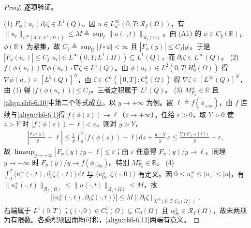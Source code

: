 \documentclass[../../main.tex]{subfiles}%
\begin{document}
\begin{proof}
逐项验证。

(1) $F_\phi(u_r)\partial_t\zeta\in L^1(Q)$。因 $u\in L^\infty_{w^*}(0,T;\mathscr{R}_f(\Omega))$，有 $\|u_r\|_{L^\infty(0,T;L^1(\Omega))}\leqslant M\triangleq\sup_t\|u(\cdot,t)\|_{\mathscr{R}_f(\Omega)}$。由 (A1) 的 $\phi\in C_b(\mathbb{R})$，$\phi(\mathbb{R})$ 为紧集，故 $C_f\triangleq\sup_{\mathbb{R}}|f\circ\phi|<\infty$ 且 $|F_\phi(y)|\leqslant C_f|y|$。于是 $|F_\phi(u_r)|\leqslant C_f|u_r|\in L^\infty(0,T;L^1(\Omega))\subseteq L^1(Q)$，而 $\partial_t\zeta\in L^\infty(Q)$。
(2) $f(\phi(u_r))\nabla\phi(u_r)\cdot\nabla\zeta\in L^1(Q)$。由 $\phi(u_r)\in L^2(0,T;H^1_0(\Omega))$ 得 $\nabla\phi(u_r)\in[L^2(Q)]^N$，由 $\zeta\in C^1([0,T];C^1_c(\Omega))$ 得 $\nabla\zeta\in[L^\infty(Q)]^N$，由 (1) 得 $|f(\phi(u_r))|\leqslant C_f$。三者之积属于 $L^1(Q)$。
(3) $M^\pm_{F_\phi}\in\mathbb{R}$ 且\eqref{align:ch6-6.10}中第二个等式成立。以 $y\to+\infty$ 为例。置 $\ell\triangleq f(\phi_{+\infty})$，由 $f$ 连续与\eqref{align:ch6-6.1}得 $f(\phi(z))\to\ell$（$z\to+\infty$）。任给 $\varepsilon>0$，取 $Y>0$ 使 $z>Y$ 时 $|f(\phi(z))-\ell|<\varepsilon$。则对 $y>Y$，
\begin{align*}
\left|\frac{F_\phi(y)}{y}-\ell\right|
\leqslant\frac{1}{y}\int_0^Y|f(\phi(z))-\ell|\,\mathrm{d}z+\frac{y-Y}{y}\,\varepsilon
\leqslant\frac{Y(C_f+|\ell|)}{y}+\varepsilon ,
\end{align*}
故 $\limsup_{y\to+\infty}|F_\phi(y)/y-\ell|\leqslant\varepsilon$；由 $\varepsilon$ 任意得 $F_\phi(y)/y\to\ell$。同理 $y\to-\infty$ 时 $F_\phi(y)/y\to f(\phi_{-\infty})$。特别 $M^\pm_{F_\phi}\in\mathbb{R}$。
(4) $\int_0^T\langle u^\pm_s(\cdot,t),\partial_t\zeta(\cdot,t)\rangle\,\mathrm{d}t$ 与 $\langle u^\pm_{0s},\zeta(\cdot,0)\rangle$ 有定义。因 $0\leqslant u^\pm_s\leqslant|u_s|\leqslant|u|$，有 $\|u^\pm_s(\cdot,t)\|_{\mathscr{R}_f(\Omega)}\leqslant\|u(\cdot,t)\|_{\mathscr{R}_f(\Omega)}\leqslant M$，故
\begin{align*}
\left|\langle u^\pm_s(\cdot,t),\partial_t\zeta(\cdot,t)\rangle\right|
\leqslant M\|\partial_t\zeta\|_{L^\infty(0,T;C_0(\Omega))},
\end{align*}
右端属于 $L^1(0,T)$；$\zeta(\cdot,0)\in C^1_c(\Omega)\subseteq C_0(\Omega)$ 且 $u^\pm_{0s}\in\mathscr{R}_f(\Omega)$，故末两项为有限数。各乘积项因而均可积，\eqref{align:ch6-6.11}两端有意义。
\end{proof}
\end{document}
